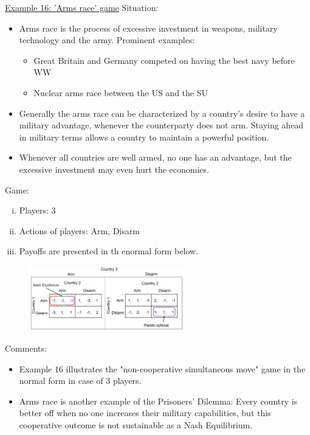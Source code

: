\underline{Example 16: 'Arms race' game}
Situation:
\begin{itemize}
    \item Arms race is the process of excessive investment in weapons, military
        technology and the army. Prominent examples:
        \begin{itemize}
            \item Great Britain and Germany competed on having the best navy
                before WW
            \item Nuclear arms race between the US and the SU
        \end{itemize}
    \item Generally the arms race can be characterized by a country's desire to
        have a military advantage, whenever the counterparty does not arm.
        Staying ahead in military terms allows a country to maintain a
        powerful position.
    \item Whenever all countries are well armed, no one has an advantage,
        but the excessive investment may even hurt the economies.
\end{itemize}

Game:
\begin{enumerate}[(i)]
    \item Players: 3
    \item Actions of players: Arm, Disarm
    \item Payoffs are presented in th enormal form below.
\end{enumerate}

\begin{figure}[H]
    \centering
    \includegraphics[width=0.6\textwidth]{Pictures/arms_race_nash_equilibrium.png}
\end{figure}

Comments:
\begin{itemize}
    \item Example $16$ illustrates the "non-cooperative simultaneous move"
        game in the normal form in case of $3$ players.
    \item Arms race is another example of the Prisoners' Dilemma: Every country
        is better off when no one increases their military capabilities, but this
        cooperative outcome is not sustainable as a Nash Equilibrium.
\end{itemize}

